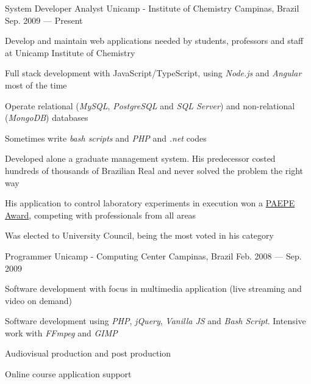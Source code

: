 

\begin{cventries}

  \cventry
    {System Developer Analyst} %
    {Unicamp - Institute of Chemistry} %
    {Campinas, Brazil} %
    {Sep. 2009 — Present} %
    {
      \begin{cvitems} %
        \item {Develop and maintain web applications needed by students, professors and staff at Unicamp Institute of Chemistry}
        \item {Full stack development with JavaScript/TypeScript, using \textit{Node.js} and \textit{Angular} most of the time}
        \item {Operate relational (\textit{MySQL}, \textit{PostgreSQL} and \textit{SQL Server}) and non-relational (\textit{MongoDB}) databases}
        \item {Sometimes write \textit{bash scripts} and \textit{PHP} and \textit{.net} codes}
        \item {Developed alone a graduate management system. His predecessor costed hundreds of thousands of Brazilian Real and never solved the problem the right way}
        \item {His application to control laboratory experiments in execution won a \href{https://www.dgrh.unicamp.br/premiopaepe}{PAEPE Award}, competing with professionals from all areas}
        \item {Was elected to University Council, being the most voted in his category}
      \end{cvitems}
    }

  \cventry
    {Programmer} %
    {Unicamp - Computing Center} %
    {Campinas, Brazil} %
    {Feb. 2008 — Sep. 2009} %
    {
      \begin{cvitems} %
        \item {Software development with focus in multimedia application (live streaming and video on demand)}
        \item {Software development using \textit{PHP}, \textit{jQuery}, \textit{Vanilla JS} and \textit{Bash Script}. Intensive work with \textit{FFmpeg} and \textit{GIMP}}
        \item {Audiovisual production and post production}
        \item {Online course application support}
      \end{cvitems}
    }

\end{cventries}
